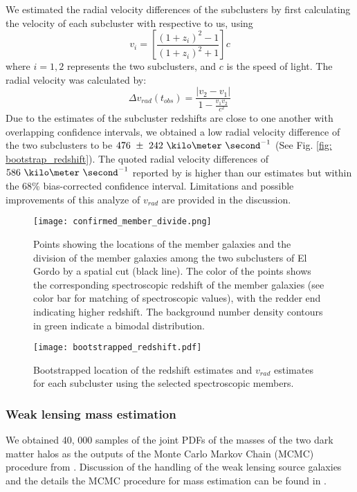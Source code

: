 We estimated the radial velocity differences of the
subclusters by first calculating the velocity of each subcluster with
respective to us, using  
\begin{equation}
	v_i = \left[ \frac{(1+z_i)^2 - 1 }{(1+z_i)^2 + 1 }\right]c
\end{equation}
where $i=1, 2$ represents the two subclusters, and $c$ is the speed of
light. The radial velocity was calculated by: 
\begin{equation}
	\Delta v_{rad}(t_{obs}) = \frac{|v_2 - v_1|}{1-\frac{v_1 v_2}{c^2}}
\end{equation}
Due to the estimates of the subcluster redshifts are close to
one another with overlapping confidence intervals, we obtained a low 
radial velocity difference of the two subclusters to be
$476~\pm~242~\kilo\meter~\second^{-1}$ (See Fig. \ref{fig:
bootstrap_redshift}). 
The quoted radial velocity differences of $586~\kilo \meter~\second^{-1}$ reported by  
is higher than our estimates but within the 68\% bias-corrected
confidence interval. Limitations and possible improvements of this analyze
of $v_{rad}$ are provided in the discussion. 

\begin{figure}
	\texttt{[image: confirmed\_member\_divide.png]}
	\caption{\label{fig:membership} Points showing the locations of the
	member galaxies and the division of the member galaxies among the two subclusters of El Gordo by a spatial cut
(black line). The color of the points shows the corresponding spectroscopic
redshift of the member galaxies (see color bar for matching of
spectroscopic values), with the redder end indicating higher
redshift. The background number density contours in green indicate a bimodal
distribution.} 
\end{figure}

\begin{figure}
	\texttt{[image: bootstrapped\_redshift.pdf]}
	\caption{\label{fig: bootstrap_redshift} Bootstrapped location of the
	redshift estimates and $v_{rad}$ estimates for each subcluster using the selected spectroscopic members.  
} 
\end{figure}
\subsubsection{Weak lensing mass estimation} 
%
We obtained 40, 000 samples of the joint PDFs of the masses of the two dark
matter halos as the outputs of the Monte Carlo Markov Chain (MCMC)
procedure from \citealt{Jee13}. Discussion of the handling of the weak
lensing source galaxies and the details the MCMC procedure for mass
estimation can be found in \citealt{Jee13}. 

